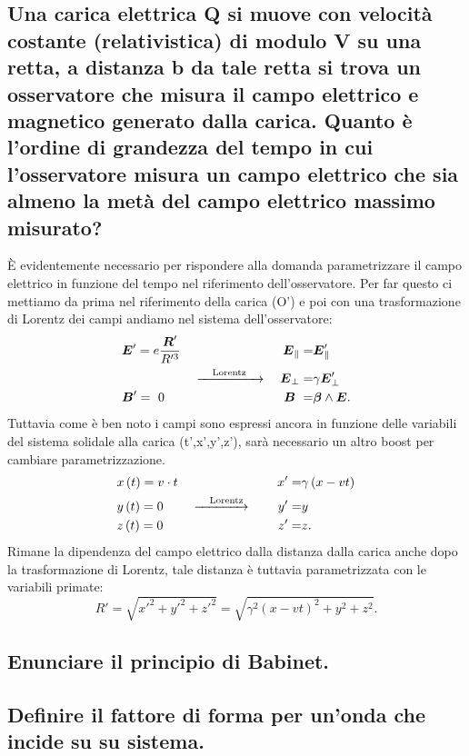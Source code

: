 \subsection[]{Una carica elettrica Q si muove con velocità costante (relativistica) di modulo V su una retta, a distanza b da tale retta si trova un osservatore che misura il campo elettrico e magnetico generato dalla carica. Quanto è l'ordine di grandezza del tempo in cui l'osservatore misura un campo elettrico che sia almeno la metà del campo elettrico massimo misurato?}
È evidentemente necessario per rispondere alla domanda parametrizzare il campo elettrico in funzione del tempo nel riferimento dell'osservatore. Per far questo ci mettiamo da prima nel riferimento della carica (O') e poi con una trasformazione di Lorentz dei campi andiamo nel sistema dell'osservatore:
\begin{align*}
	&\boldsymbol{E}'= e \frac{\boldsymbol{R}'}{R'^3}	&&					&\boldsymbol{E}_{\|}=&\boldsymbol{E}'_{\|} \\
	& 	 						&\ce{->[\quad \text{Lorentz}\quad]}&	&\boldsymbol{E}_{\bot}=&\gamma \boldsymbol{E}'_{\bot}\\ 
	&\boldsymbol{B}'= \ 0					&&					&\boldsymbol{B}\ =&\boldsymbol{\beta}\wedge \boldsymbol{E} 
.\end{align*}
Tuttavia come è ben noto i campi sono espressi ancora in funzione delle variabili del sistema solidale alla carica (t',x',y',z'), sarà necessario un altro boost per cambiare parametrizzazione.
\begin{align*}
	&x\left( t \right) = v\cdot t	&&					&x'=&\gamma\left( x-vt \right) \\
	&y\left( t \right) = 0		&\ce{ ->[\quad \text{Lorentz}] \quad}&	&y'=&y \\
	&z\left( t \right) = 0		&&					&z'=&z
.\end{align*}
Rimane la dipendenza del campo elettrico dalla distanza dalla carica anche dopo la trasformazione di Lorentz, tale distanza è tuttavia parametrizzata con le variabili primate: 
\[
	R' = \sqrt{x'^2 + y'^2 + z'^2} = \sqrt{\gamma^2\left( x-vt \right)^2 + y^2 + z^2} 
.\] 

\subsection[]{Enunciare il principio di Babinet.}

\subsection[]{Definire il fattore di forma per un'onda che incide su su sistema.}

